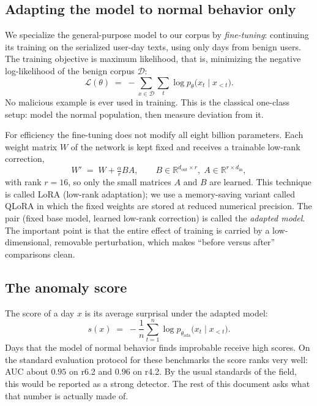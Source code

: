 \documentclass[10pt]{article}
\begin{document}
\subsection{Adapting the model to normal behavior only}

We specialize the general-purpose model to our corpus by
\emph{fine-tuning}: continuing its training on the serialized user-day
texts, using only days from benign users. The training objective is
maximum likelihood, that is, minimizing the negative log-likelihood of
the benign corpus $\mathcal{D}$:
\begin{equation}
\mathcal{L}(\theta) \;=\; -\sum_{x \in \mathcal{D}} \sum_{t}
\log p_\theta\bigl(x_t \mid x_{<t}\bigr).
\end{equation}
No malicious example is ever used in training. This is the classical
one-class setup: model the normal population, then measure deviation
from it.

For efficiency the fine-tuning does not modify all eight billion
parameters. Each weight matrix $W$ of the network is kept fixed and
receives a trainable low-rank correction,
\begin{equation}
W' \;=\; W + \tfrac{\alpha}{r} BA, \qquad B \in \mathbb{R}^{d_{\mathrm{out}}
\times r},\; A \in \mathbb{R}^{r \times d_{\mathrm{in}}},
\end{equation}
with rank $r = 16$, so only the small matrices $A$ and $B$ are learned.
This technique is called LoRA (low-rank adaptation); we use a
memory-saving variant called QLoRA in which the fixed weights are stored
at reduced numerical precision. The pair (fixed base model, learned
low-rank correction) is called the \emph{adapted model}. The important
point is that the entire effect of training is carried by a
low-dimensional, removable perturbation, which makes ``before versus
after'' comparisons clean.

\subsection{The anomaly score}

The score of a day $x$ is its average surprisal under the adapted
model:
\begin{equation}
s(x) \;=\; -\frac{1}{n}\sum_{t=1}^{n} \log
p_{\theta_{\mathrm{ada}}}\bigl(x_t \mid x_{<t}\bigr).
\end{equation}
Days that the model of normal behavior finds improbable receive high
scores. On the standard evaluation protocol for these benchmarks the
score ranks very well: AUC about $0.95$ on r6.2 and $0.96$ on r4.2. By
the usual standards of the field, this would be reported as a strong
detector. The rest of this document asks what that number is actually
made of.
\end{document}
